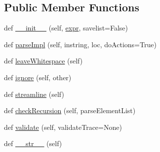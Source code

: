 \subsection*{Public Member Functions}
\begin{DoxyCompactItemize}
\item 
def \hyperlink{classpip_1_1__vendor_1_1pyparsing_1_1ParseElementEnhance_a8737d46a70ea9c0b500281e8ba6c00c7}{\+\_\+\+\_\+init\+\_\+\+\_\+} (self, \hyperlink{classpip_1_1__vendor_1_1pyparsing_1_1ParseElementEnhance_af574b49a0a7d914693fdaa833df7098f}{expr}, savelist=False)
\item 
def \hyperlink{classpip_1_1__vendor_1_1pyparsing_1_1ParseElementEnhance_a4bd195faf0317d31a69795d1f0818fcd}{parse\+Impl} (self, instring, loc, do\+Actions=True)
\item 
def \hyperlink{classpip_1_1__vendor_1_1pyparsing_1_1ParseElementEnhance_a84cb38c815e2e384b6616702eacc35ac}{leave\+Whitespace} (self)
\item 
def \hyperlink{classpip_1_1__vendor_1_1pyparsing_1_1ParseElementEnhance_a255dfc9812e718bab064c6db0ab3ef56}{ignore} (self, other)
\item 
def \hyperlink{classpip_1_1__vendor_1_1pyparsing_1_1ParseElementEnhance_ae59a6cc63aef14a91fa5d13798f330e5}{streamline} (self)
\item 
def \hyperlink{classpip_1_1__vendor_1_1pyparsing_1_1ParseElementEnhance_a8696ae672b44edff60dda1f1cb9ea384}{check\+Recursion} (self, parse\+Element\+List)
\item 
def \hyperlink{classpip_1_1__vendor_1_1pyparsing_1_1ParseElementEnhance_a99875cec6faba740c439775891018963}{validate} (self, validate\+Trace=None)
\item 
def \hyperlink{classpip_1_1__vendor_1_1pyparsing_1_1ParseElementEnhance_a54d6c0b28f6d1bc5f19aefad074656f3}{\+\_\+\+\_\+str\+\_\+\+\_\+} (self)
\end{DoxyCompactItemize}
